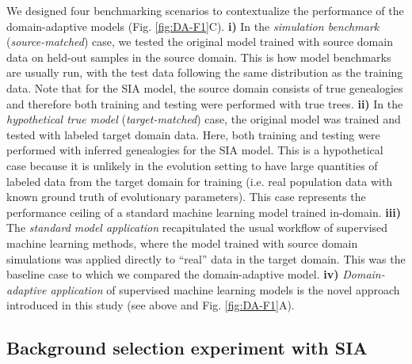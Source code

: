 We designed four benchmarking scenarios to contextualize the performance of the domain-adaptive models (Fig. \ref{fig:DA-F1}C). \textbf{i)} In the \textit{simulation benchmark} (\textit{source-matched}) case, we tested the original model trained with source domain data on held-out samples in the source domain. This is how model benchmarks are usually run, with the test data following the same distribution as the training data. Note that for the \ac{SIA} model, the source domain consists of true genealogies and therefore both training and testing were performed with true trees. \textbf{ii)} In the \textit{hypothetical true model} (\textit{target-matched}) case, the original model was trained and tested with labeled target domain data. Here, both training and testing were performed with inferred genealogies for the \ac{SIA} model. This is a hypothetical case because it is unlikely in the evolution setting to have large quantities of labeled data from the target domain for training (i.e. real population data with known ground truth of evolutionary parameters). This case represents the performance ceiling of a standard machine learning model trained in-domain. \textbf{iii)} The \textit{standard model application} recapitulated the usual workflow of supervised machine learning methods, where the model trained with source domain simulations was applied directly to “real” data in the target domain. This was the baseline case to which we compared the domain-adaptive model. \textbf{iv)} \textit{Domain-adaptive application} of supervised machine learning models is the novel approach introduced in this study (see above and Fig. \ref{fig:DA-F1}A).

\subsection{Background selection experiment with \ac{SIA}}

